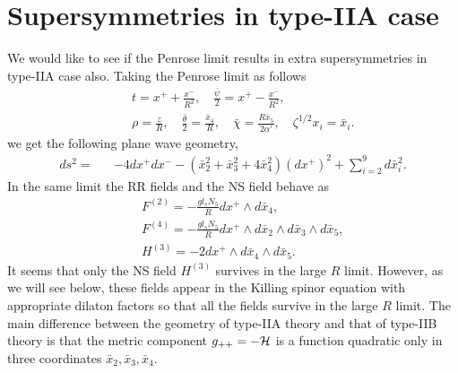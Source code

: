 \documentclass[a4paper,12pt]{article}
\begin{document}
\section{Supersymmetries in type-IIA case}\label{v}

We would like to see if the Penrose limit results in extra supersymmetries in type-IIA case also. 
Taking the Penrose limit as follows
\begin{eqnarray}\label{pplimit78}
&&t=x^++\frac{x^-}{R^2},\quad \frac{\bar{\psi}}{2}=x^+-\frac{x^-}{R^2},\nonumber\\
&&\rho=\frac{z}{R},\quad \frac{\bar{\theta}}{2}=\frac{\bar{x}_4}{R},\quad
\bar{\chi}= \frac{R\bar{x}_5}{2\alpha'},\quad \zeta^{1/2}x_i = \bar{x}_i.
\end{eqnarray}
we get the following plane wave geometry,
\begin{eqnarray}\label{2ametric}
ds^2=&&-4dx^+dx^--\left(\bar{x}_2^2+\bar{x}_3^2+4\bar{x}_4^2\right)(dx^+)^2+\sum\limits_{i=2}^9 d\bar{x}_i^2.
\end{eqnarray}
In the same limit the RR fields and the NS field behave as
\begin{eqnarray}\label{rrns}
&&F^{(2)}=-\frac{gl_sN_5}{R}dx^+\wedge d\bar{x}_4,\nonumber\\
&&F^{(4)}=-\frac{gl_sN_5}{R}dx^+\wedge d\bar{x}_2\wedge d\bar{x}_3\wedge d\bar{x}_5,\\
&&H^{(3)}=-2dx^+\wedge d\bar{x}_4 \wedge d\bar{x}_5.\nonumber
\end{eqnarray}
It seems that only the NS field $H^{(3)}$ survives in the large $R$ limit. However, as we will see below, these fields appear in the Killing spinor equation with appropriate dilaton factors so that all the fields survive in the large $R$ limit.
The main difference between the geometry of type-IIA theory and that of type-IIB theory is that the metric component $g_{++}=-{\cal H}$ is a function quadratic only in three coordinates $\bar{x}_2,\bar{x}_3,\bar{x}_4$.
\end{document}
